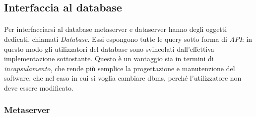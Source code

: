 \documentclass[11pt,a4paper,english]{article}
\begin{document}
\subsection{Interfaccia al database}

\paragraph{} Per interfacciarsi al database metaserver e dataserver hanno degli oggetti dedicati, chiamati \emph{Database}. Essi espongono tutte le query sotto forma di \emph{API}: in questo modo gli utilizzatori del database sono svincolati dall'effettiva implementazione sottostante. Questo è un vantaggio sia in termini di \emph{incapsulamento}, che rende più semplice la progettazione e manutenzione del software, che nel caso in cui si voglia cambiare dbms, perché l'utilizzatore non deve essere modificato. 

\subsubsection{Metaserver}
\end{document}

